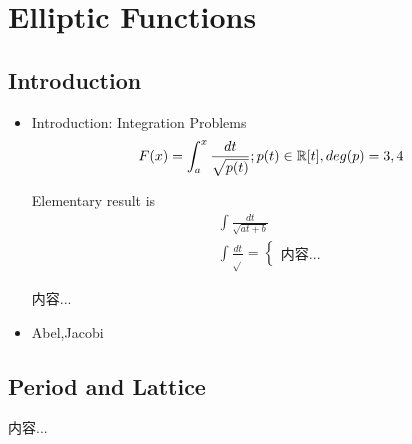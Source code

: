 \documentclass[Total.tex]{subfiles}
\begin{document}
	\chapter{Elliptic Functions}
		\section{Introduction}
			\begin{itemize}
				\item Introduction: Integration Problems
				\begin{gather*}
					F(x)=\int_a^x \frac{dt}{\sqrt{p(t)}};p(t)\in \mathbb{R}[t],deg(p)=3,4
				\end{gather*}
				
				Elementary result is
				\begin{gather*}
					\int \frac{dt}{\sqrt{at+b}}\\
					\int\frac{dt}{\sqrt{ }}=\begin{cases}
						内容...
					\end{cases}
				\end{gather*}
				
				\begin{proposition}
					内容...
				\end{proposition}
				
				\item Abel,Jacobi
			\end{itemize}
		\section{Period and Lattice}
			\begin{Def}
				内容...
			\end{Def}
\end{document}
